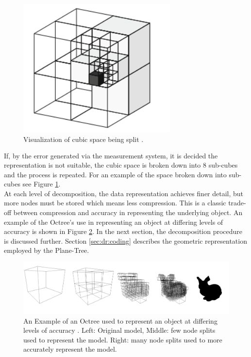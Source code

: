 \begin{figure}[!htb]
\centering
\includegraphics[width=8cm]{images/methodology/pt/octreeVis}
\caption{Visualization of cubic space being split \cite{Hornung13Octomap}.}
\label{fig:SpaceVis}
\end{figure}

If, by the error generated via the measurement system, it is decided the representation is not suitable, the cubic space is broken down into 8 sub-cubes and the process is repeated. For an example of the space broken down into sub-cubes see Figure \ref{fig:SpaceVis}. \\

At each level of decomposition, the data representation achieves finer detail, but more nodes must be stored which means less compression. This is a classic trade-off between compression and accuracy in representing the underlying object. An example of the Octree's use in representing an object at differing levels of accuracy is shown in Figure \ref{fig:octreeaccuracy}. In the next section, the decomposition procedure is discussed further. Section \ref{sec:dr:coding} describes the geometric representation employed by the Plane-Tree.


\begin{figure}[!htb]
\centering
\includegraphics[width=14cm]{images/ch2/OctreeExample}
\caption{An Example of an Octree used to represent an object at differing levels of accuracy \cite{Hornung13Octomap}. Left: Original model, Middle: few node splits used to represent the model. Right: many node splits used to more accurately represent the model.}
\label{fig:octreeaccuracy}
\end{figure}


